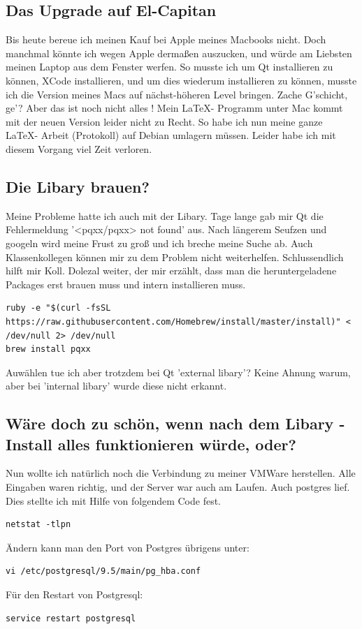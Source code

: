 \subsection{Das Upgrade auf El-Capitan}
Bis heute bereue ich meinen Kauf bei Apple meines Macbooks nicht.
Doch manchmal könnte ich wegen Apple dermaßen auszucken, und würde 
am Liebsten meinen Laptop aus dem Fenster werfen.
So musste ich um Qt installieren zu können,
XCode installieren, und um dies wiederum installieren zu können,
musste ich die Version meines Macs auf nächst-höheren Level bringen.
Zache G'schicht, ge'?
Aber das ist noch nicht alles !
Mein \LaTeX - Programm unter Mac kommt mit der neuen Version leider nicht zu Recht. So habe ich nun meine ganze \LaTeX - Arbeit (Protokoll) auf Debian umlagern müssen.
Leider habe ich mit diesem Vorgang viel Zeit verloren.

\subsection{Die Libary brauen?}
Meine Probleme hatte ich auch mit der Libary.
Tage lange gab mir Qt die Fehlermeldung '<pqxx/pqxx> not found' aus.
Nach längerem Seufzen und googeln wird meine Frust zu groß und ich breche meine Suche ab.
Auch Klassenkollegen können mir zu dem Problem nicht weiterhelfen.
Schlussendlich hilft mir Koll. Dolezal weiter, der mir erzählt, dass man die heruntergeladene Packages
erst brauen muss und intern installieren muss.

\lstset{language=bash}
\begin{lstlisting}
ruby -e "$(curl -fsSL https://raw.githubusercontent.com/Homebrew/install/master/install)" < /dev/null 2> /dev/null
brew install pqxx
\end{lstlisting}

Auwählen tue ich aber trotzdem bei Qt 'external libary'?
Keine Ahnung warum, aber bei 'internal libary' wurde diese nicht erkannt.

\subsection{Wäre doch zu schön, wenn nach dem Libary - Install alles funktionieren würde, oder?}
Nun wollte ich natürlich noch die Verbindung zu meiner VMWare herstellen.
Alle Eingaben waren richtig, und der Server war auch am Laufen.
Auch postgres lief.
Dies stellte ich mit Hilfe von folgendem Code fest.
\lstset{language=bash}
\begin{lstlisting}
netstat -tlpn
\end{lstlisting}
Ändern kann man den Port von Postgres übrigens unter:
\lstset{language=bash}
\begin{lstlisting}
vi /etc/postgresql/9.5/main/pg_hba.conf
\end{lstlisting}
Für den Restart von Postgresql:
\begin{lstlisting}
service restart postgresql
\end{lstlisting}

